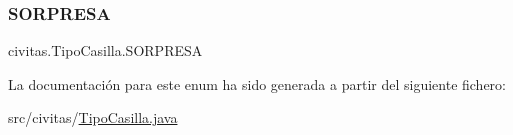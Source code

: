 \subsubsection{\texorpdfstring{S\+O\+R\+P\+R\+E\+SA}{SORPRESA}}
{\footnotesize\ttfamily civitas.\+Tipo\+Casilla.\+S\+O\+R\+P\+R\+E\+SA}



La documentación para este enum ha sido generada a partir del siguiente fichero\+:\begin{DoxyCompactItemize}
\item 
src/civitas/\hyperlink{TipoCasilla_8java}{Tipo\+Casilla.\+java}\end{DoxyCompactItemize}
